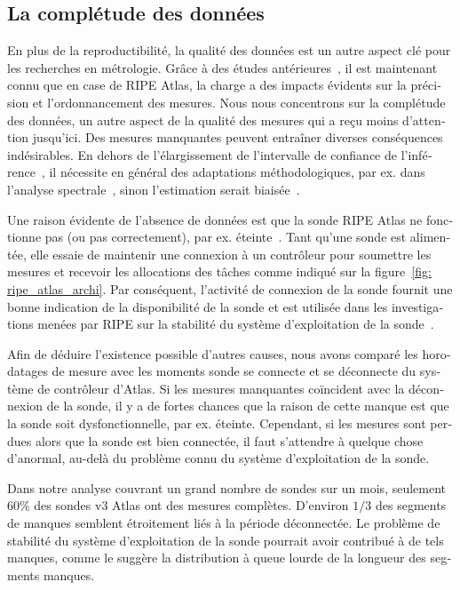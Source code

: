 \begin{otherlanguage}{french}
\subsection{La complétude des données}

En plus de la reproductibilité, la qualité des données est un autre aspect clé pour les recherches en métrologie.
Grâce à des études antérieures~\cite{Holterbach2015a, Bajpai2015}, il est maintenant connu que en case de RIPE Atlas, la charge a des impacts évidents sur la précision et l'ordonnancement des mesures.
Nous nous concentrons sur la complétude des données, un autre aspect de la qualité des mesures qui a reçu moins d'attention jusqu'ici. 
Des mesures manquantes peuvent entraîner diverses conséquences indésirables.
En dehors de l'élargissement de l'intervalle de confiance de l'inférence~\cite{Fontugne2016}, 
il nécessite en général des adaptations méthodologiques, par ex. dans l'analyse spectrale~\cite{Babu2010, Luckie2014, shao2016}, 
sinon l'estimation serait biaisée~\cite {Baraldi2010}.

Une raison évidente de l'absence de données est que la sonde RIPE Atlas ne fonctionne pas (ou pas correctement), par ex. éteinte~\cite{schedule}.
Tant qu'une sonde est alimentée, elle essaie de maintenir une connexion à un contrôleur pour soumettre les mesures et recevoir les allocations des tâches comme indiqué sur la figure~\ref{fig: ripe_atlas_archi}.
Par conséquent, l'activité de connexion de la sonde fournit une bonne indication de la disponibilité de la sonde et est utilisée dans les investigations menées par RIPE sur la stabilité du système d'exploitation de la sonde~\cite{1look, 2look, 3look}.

Afin de déduire l'existence possible d'autres causes, nous avons comparé les horodatages de mesure avec les moments sonde se connecte et se déconnecte du système de contrôleur d'Atlas.
Si les mesures manquantes coïncident avec la déconnexion de la sonde, il y a de fortes chances que la raison de cette manque est que la sonde soit dysfonctionnelle, par ex. éteinte.
Cependant, si les mesures sont perdues alors que la sonde est bien connectée, il faut s'attendre à quelque chose d'anormal, au-delà du problème connu du système d'exploitation de la sonde.

Dans notre analyse couvrant un grand nombre de sondes sur un mois, seulement $60\%$ des sondes v3 Atlas ont des mesures complètes. 
D'environ $1/3$ des segments de manques semblent étroitement liés à la période déconnectée. 
Le problème de stabilité du système d'exploitation de la sonde pourrait avoir contribué à de tels manques, 
comme le suggère la distribution à queue lourde de la longueur des segments manques.


\end{otherlanguage}
